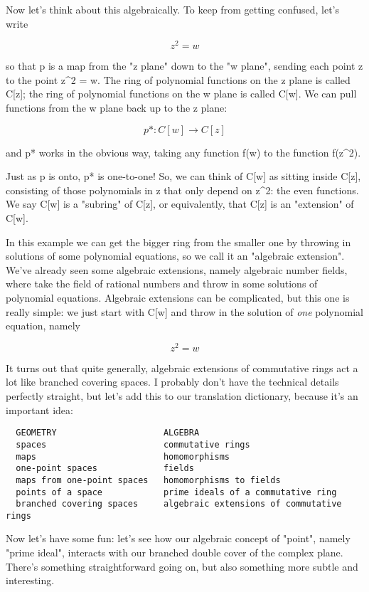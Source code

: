 Now let's think about this algebraically.  To keep from getting confused,
let's write 

$$
z^{2} = w
$$
    

so that p is a map from the "z plane" down to the "w plane", sending each 
point z to the point z^{2} = w.  The ring of polynomial 
functions on the z
plane is called C[z]; the ring of polynomial functions on the w plane is
called C[w].  We can pull functions from the w plane back up to the z 
plane:

$$
p*: C[w] \to  C[z]
$$
    

and p* works in the obvious way, taking any 
function f(w) to the function f(z^{2}).

Just as p is onto, p* is one-to-one!  So, we can think of C[w] as 
sitting inside C[z], consisting of those polynomials in z that only 
depend on z^{2}: the even functions.  We say C[w] 
is a "subring" of C[z], 
or equivalently, that C[z] is an "extension" of C[w].   

In this example we can get the bigger ring from the smaller one by 
throwing in solutions of some polynomial equations, so we call it an 
"algebraic extension".  We've already seen some algebraic extensions,
namely algebraic number fields, where take the field of rational numbers
and throw in some solutions of polynomial equations.  Algebraic extensions 
can be complicated, but this one is really simple: we just start with 
C[w] and throw in the solution of \emph{one} polynomial equation, namely

$$
z^{2} = w
$$
    

It turns out that quite generally, algebraic extensions of commutative
rings act a lot like branched covering spaces.  I probably don't have 
the technical details perfectly straight, but let's add this to our
translation dictionary, because it's an important idea:

\begin{verbatim}
  GEOMETRY                     ALGEBRA
  spaces                       commutative rings
  maps                         homomorphisms
  one-point spaces             fields
  maps from one-point spaces   homomorphisms to fields
  points of a space            prime ideals of a commutative ring
  branched covering spaces     algebraic extensions of commutative rings

\end{verbatim}
    
Now let's have some fun: let's see how our algebraic concept 
of "point",
namely "prime ideal", interacts with our branched double cover of the 
complex plane.   There's something straightforward going on, but also 
something more subtle and interesting.

